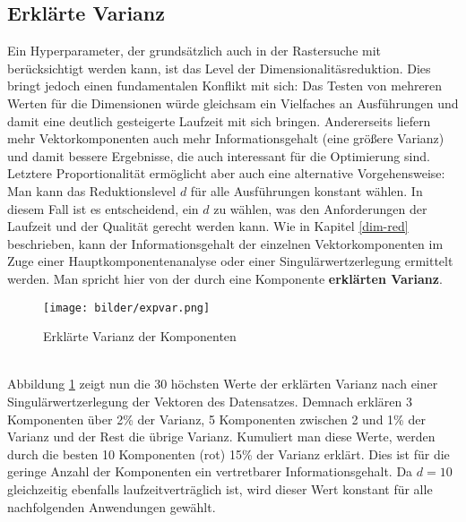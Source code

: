 \subsection{Erklärte Varianz}
Ein Hyperparameter, der grundsätzlich auch in der Rastersuche mit berücksichtigt werden kann, ist das Level der Dimensionalitäsreduktion. Dies bringt jedoch einen fundamentalen Konflikt mit sich: Das Testen von mehreren Werten für die Dimensionen würde gleichsam ein Vielfaches an Ausführungen und damit eine deutlich gesteigerte Laufzeit mit sich bringen. Andererseits liefern mehr Vektorkomponenten auch mehr Informationsgehalt (eine größere Varianz) und damit bessere Ergebnisse, die auch interessant für die Optimierung sind. Letztere Proportionalität ermöglicht aber auch eine alternative Vorgehensweise: Man kann das Reduktionslevel $d$ für alle Ausführungen konstant wählen. In diesem Fall ist es entscheidend, ein $d$ zu wählen, was den Anforderungen der Laufzeit und der Qualität gerecht werden kann. Wie in Kapitel \ref{dim-red} beschrieben, kann der Informationsgehalt der einzelnen Vektorkomponenten im Zuge einer Hauptkomponentenanalyse oder einer Singulärwertzerlegung ermittelt werden. Man spricht hier von der durch eine Komponente \textbf{erklärten Varianz}.
\begin{figure}[htb]
	\begin{center}
		\texttt{[image: bilder/expvar.png]}
		\caption{Erklärte Varianz der Komponenten}\label{expvar}
	\end{center}
\end{figure}\\
Abbildung \ref{expvar} zeigt nun die 30 höchsten Werte der erklärten Varianz nach einer Singulärwertzerlegung der Vektoren des Datensatzes. Demnach erklären 3 Komponenten über 2\% der Varianz, 5 Komponenten zwischen 2 und 1\% der Varianz und der Rest die übrige Varianz. Kumuliert man diese Werte, werden durch die besten 10 Komponenten (rot) 15\% der Varianz erklärt. Dies ist für die geringe Anzahl der Komponenten ein vertretbarer Informationsgehalt. Da $d = 10$ gleichzeitig ebenfalls laufzeitverträglich ist, wird dieser Wert konstant für alle nachfolgenden Anwendungen gewählt.
\pagebreak
